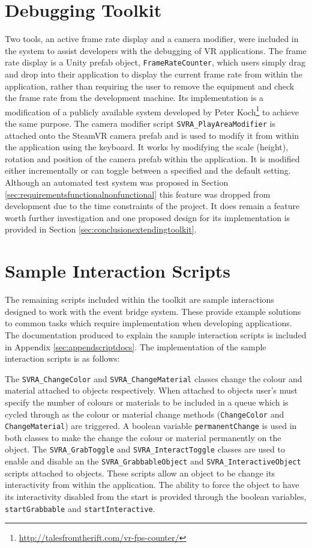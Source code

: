 \documentclass{l4proj}
\begin{document}
\section{Debugging Toolkit}
\label{sec:implementationdebuggingtoolkit}
Two tools, an active frame rate display and a camera modifier, were included in the system to assist developers with the debugging of VR applications. The frame rate display is a Unity prefab object, \texttt{FrameRateCounter}, which users simply drag and drop into their application to display the current frame rate from within the application, rather than requiring the user to remove the equipment and check the frame rate from the development machine. Its implementation is a modification of a publicly available system developed by Peter Koch\footnote{\url{http://talesfromtherift.com/vr-fps-counter/}} to achieve the same purpose. The camera modifier script \texttt{SVRA\_PlayAreaModifier} is attached onto the SteamVR camera prefab and is used to modify it from within the application using the keyboard. It works by modifying the scale (height), rotation and position of the camera prefab within the application. It is modified either incrementally or can toggle between a specified and the default setting. Although an automated test system was proposed in Section \ref{sec:requirementsfunctionalnonfunctional} this feature was dropped from development due to the time constraints of the project. It does remain a feature worth further investigation and one proposed design for its implementation is provided in Section \ref{sec:conclusionextendingtoolkit}. 

\section{Sample Interaction Scripts}
\label{sec:implementationsampleinteractionscripts}
The remaining scripts included within the toolkit are sample interactions designed to work with the event bridge system. These provide example solutions to common tasks which require implementation when developing applications. The documentation produced to explain the sample interaction scripts is included in Appendix \ref{sec:appendscriptdocs}. The implementation of the sample interaction scripts is as follows:

The \texttt{SVRA\_ChangeColor} and \texttt{SVRA\_ChangeMaterial} classes change the colour and material attached to objects respectively. When attached to objects user's must specify the number of colours or materials to be included in a queue which is cycled through as the colour or material change methods (\texttt{ChangeColor} and \texttt{ChangeMaterial}) are triggered. A boolean variable \texttt{permanentChange} is used in both classes to make the change the colour or material permanently on the object. The \texttt{SVRA\_GrabToggle} and \texttt{SVRA\_InteractToggle} classes are used to enable and disable an the \texttt{SVRA\_GrabbableObject} and \texttt{SVRA\_InteractiveObject} scripts attached to objects. These scripts allow an object to be change its interactivity from within the application. The ability to force the object to have its interactivity disabled from the start is provided through the boolean variables, \texttt{startGrabbable} and \texttt{startInteractive}.
\end{document}
